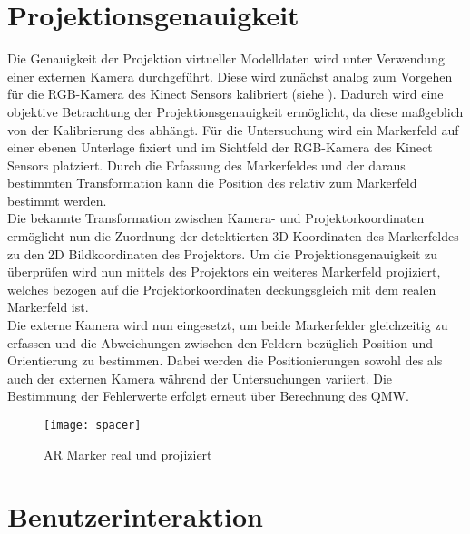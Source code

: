 \section{Projektionsgenauigkeit}
Die Genauigkeit der Projektion virtueller Modelldaten wird unter Verwendung einer externen Kamera durchgeführt. Diese wird zunächst analog zum Vorgehen für die RGB-Kamera des Kinect Sensors kalibriert (siehe ). Dadurch wird eine objektive Betrachtung der Projektionsgenauigkeit ermöglicht, da diese maßgeblich von der Kalibrierung des  abhängt. Für die Untersuchung wird ein Markerfeld auf einer ebenen Unterlage fixiert und im Sichtfeld der RGB-Kamera des Kinect Sensors platziert. Durch die Erfassung des Markerfeldes und der daraus bestimmten Transformation kann die Position des  relativ zum Markerfeld bestimmt werden.\\
Die bekannte Transformation zwischen Kamera- und Projektorkoordinaten ermöglicht nun die Zuordnung der detektierten 3D Koordinaten des Markerfeldes zu den 2D Bildkoordinaten des Projektors. Um die Projektionsgenauigkeit zu überprüfen wird nun mittels des Projektors ein weiteres Markerfeld projiziert, welches bezogen auf die Projektorkoordinaten deckungsgleich mit dem realen Markerfeld ist. \\
Die externe Kamera wird nun eingesetzt, um beide Markerfelder gleichzeitig zu erfassen und die Abweichungen zwischen den Feldern bezüglich Position und Orientierung zu bestimmen. Dabei werden die Positionierungen sowohl des  als auch der externen Kamera während der Untersuchungen variiert. Die Bestimmung der Fehlerwerte erfolgt erneut über Berechnung des QMW.

\begin{figure}[!ht]
	\begin{center}
		\texttt{[image: spacer]}
		\caption{AR Marker real und projiziert}
		\label{fig.arprojected}
	\end{center}
\end{figure}


\section{Benutzerinteraktion}